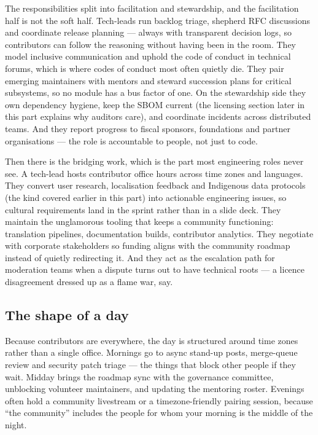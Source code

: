 The responsibilities split into facilitation and stewardship, and the facilitation half is not the soft half. Tech-leads run backlog triage, shepherd RFC discussions and coordinate release planning — always with transparent decision logs, so contributors can follow the reasoning without having been in the room. They model inclusive communication and uphold the code of conduct in technical forums, which is where codes of conduct most often quietly die. They pair emerging maintainers with mentors and steward succession plans for critical subsystems, so no module has a bus factor of one. On the stewardship side they own dependency hygiene, keep the SBOM current (the licensing section later in this part explains why auditors care), and coordinate incidents across distributed teams. And they report progress to fiscal sponsors, foundations and partner organisations — the role is accountable to people, not just to code.


Then there is the bridging work, which is the part most engineering roles never see. A tech-lead hosts contributor office hours across time zones and languages. They convert user research, localisation feedback and Indigenous data protocols (the kind covered earlier in this part) into actionable engineering issues, so cultural requirements land in the sprint rather than in a slide deck. They maintain the unglamorous tooling that keeps a community functioning: translation pipelines, documentation builds, contributor analytics. They negotiate with corporate stakeholders so funding aligns with the community roadmap instead of quietly redirecting it. And they act as the escalation path for moderation teams when a dispute turns out to have technical roots — a licence disagreement dressed up as a flame war, say.



\subsection{The shape of a day}


Because contributors are everywhere, the day is structured around time zones rather than a single office. Mornings go to async stand-up posts, merge-queue review and security patch triage — the things that block other people if they wait. Midday brings the roadmap sync with the governance committee, unblocking volunteer maintainers, and updating the mentoring roster. Evenings often hold a community livestream or a timezone-friendly pairing session, because ``the community'' includes the people for whom your morning is the middle of the night.


